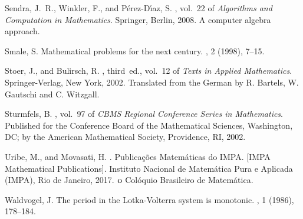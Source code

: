 \documentclass[12pt,a4paper,reqno]{amsart}
\begin{document}
\begin{thebibliography}{10}
{\sc Sendra, J.~R., Winkler, F., and P\'{e}rez-D\'{\i}az, S.}
, vol.~22 of {\em Algorithms and
  Computation in Mathematics}.
\newblock Springer, Berlin, 2008.
\newblock A computer algebra approach.

{\sc Smale, S.}
\newblock Mathematical problems for the next century.
, 2 (1998), 7--15.

{\sc Stoer, J., and Bulirsch, R.}
, third~ed., vol.~12 of {\em
  Texts in Applied Mathematics}.
\newblock Springer-Verlag, New York, 2002.
\newblock Translated from the German by R. Bartels, W. Gautschi and C.
  Witzgall.

{\sc Sturmfels, B.}
, vol.~97 of {\em CBMS
  Regional Conference Series in Mathematics}.
\newblock Published for the Conference Board of the Mathematical Sciences,
  Washington, DC; by the American Mathematical Society, Providence, RI, 2002.

{\sc Uribe, M., and Movasati, H.}
.
\newblock Publica\c{c}\~{o}es Matem\'{a}ticas do IMPA. [IMPA Mathematical
  Publications]. Instituto Nacional de Matem\'{a}tica Pura e Aplicada (IMPA),
  Rio de Janeiro, 2017.
${^{{}}{\rm{o}}}$ Col\'{o}quio Brasileiro de Matem\'{a}tica.

{\sc Waldvogel, J.}
\newblock The period in the {L}otka-{V}olterra system is monotonic.
, 1 (1986), 178--184.

\end{thebibliography}
\end{document}
